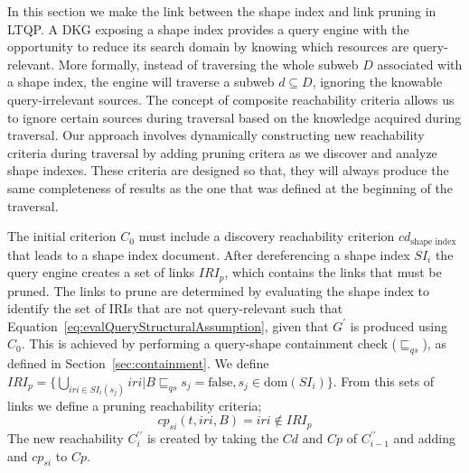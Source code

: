 In this section we make the link between the shape index and link pruning in LTQP.
A DKG exposing a shape index provides a query engine with the opportunity to reduce its search domain by knowing which resources are query-relevant.
More formally, instead of traversing the whole subweb $D$ associated with a shape index, the engine will traverse a subweb $d \subseteq D$, ignoring the knowable query-irrelevant sources.
The concept of composite reachability criteria allows us to ignore certain sources during traversal based on the knowledge acquired during traversal.
Our approach involves dynamically constructing new reachability criteria during traversal by adding pruning critera as we discover and analyze shape indexes.
These criteria are designed so that, they will always produce the same completeness of results as the one that was defined at the beginning of the traversal.

\iffalse
\rt{I still think introducing time here is a really bad idea. I'm almost certain that reviewers will shoot the paper down because of this. In the formalization, let's just assume prior knowledge of all shape indexes and corresponding reachability criteria. Combining them during query execution is an implementation detail.}
More formally, let us introduce time $t$ as a factor for our reachability criteria $C_t$.
The query execution begins with an initial reachability criterion $C_0$.
At any time $t$, Equation~\ref{eq:evalQueryStructuralAssumption} must hold if we consider $C_t = C_{t+1} = C_{t+2} \dots = C_{tf}$ until the end of the execution $tf$, given that $G^{\prime}$ is produced using $C_0$.
\fi
The initial criterion $C_0$ must include a discovery reachability criterion $cd_{\text{shape index}}$ that leads to a shape index document.
After dereferencing a shape index $SI_i$ the query engine creates a set of links $IRI_p$, which contains the links that must be pruned.
The links to prune are determined by evaluating the shape index to identify the set of IRIs that are not query-relevant such that Equation~\ref{eq:evalQueryStructuralAssumption}, given that $G^{\prime}$ is produced using $C_0$.
This is achieved by performing a query-shape containment check ($\sqsubseteq_{qs}$), as defined in Section~\ref{sec:containment}.
We define
$IRI_p = \{ \bigcup_{iri \in SI_i(s_j)} iri | B \sqsubseteq_{qs}  s_j = \mathrm{false}, s_j \in \text{dom}(SI_i) \}$.
From this sets of links we define a pruning reachability criteria;
\begin{equation}
       cp_{si}(t, iri, B) = iri \notin IRI_p
\end{equation}
The new reachability $C^{\prime\prime}_i$ is created by taking the $Cd$ and $Cp$ of $C^{\prime\prime}_{i-1}$ and adding
and $cp_{si}$ to $Cp$.


